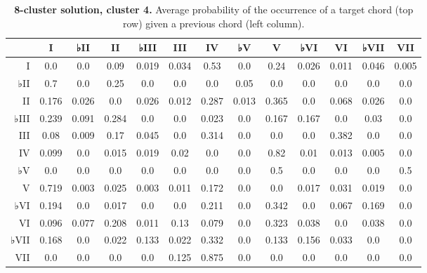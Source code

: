 \begin{table}[htbp]
\begin{minipage}{\linewidth}
\setlength{\tymax}{0.5\linewidth}
\centering
\small
\caption{\textbf{8-cluster solution, cluster 4.} Average probability of the occurrence of a target chord (top row) given a previous chord (left column).}
\label{8-clustersolutioncluster4.averageprobabilityoftheoccurrenceofatargetchordtoprowgivenapreviouschordleftcolumn.}
\begin{tabulary}{\textwidth}{@{}RCCCCCCCCCCCC@{}} \toprule
&I&♭II&II&♭III&III&IV&♭V&V&♭VI&VI&♭VII&VII\\
\midrule
I&0.0&0.0&0.09&0.019&0.034&0.53&0.0&0.24&0.026&0.011&0.046&0.005\\
♭II&0.7&0.0&0.25&0.0&0.0&0.0&0.05&0.0&0.0&0.0&0.0&0.0\\
II&0.176&0.026&0.0&0.026&0.012&0.287&0.013&0.365&0.0&0.068&0.026&0.0\\
♭III&0.239&0.091&0.284&0.0&0.0&0.023&0.0&0.167&0.167&0.0&0.03&0.0\\
III&0.08&0.009&0.17&0.045&0.0&0.314&0.0&0.0&0.0&0.382&0.0&0.0\\
IV&0.099&0.0&0.015&0.019&0.02&0.0&0.0&0.82&0.01&0.013&0.005&0.0\\
♭V&0.0&0.0&0.0&0.0&0.0&0.0&0.0&0.5&0.0&0.0&0.0&0.5\\
V&0.719&0.003&0.025&0.003&0.011&0.172&0.0&0.0&0.017&0.031&0.019&0.0\\
♭VI&0.194&0.0&0.017&0.0&0.0&0.211&0.0&0.342&0.0&0.067&0.169&0.0\\
VI&0.096&0.077&0.208&0.011&0.13&0.079&0.0&0.323&0.038&0.0&0.038&0.0\\
♭VII&0.168&0.0&0.022&0.133&0.022&0.332&0.0&0.133&0.156&0.033&0.0&0.0\\
VII&0.0&0.0&0.0&0.0&0.125&0.875&0.0&0.0&0.0&0.0&0.0&0.0\\

\bottomrule

\end{tabulary}
\end{minipage}
\end{table}

